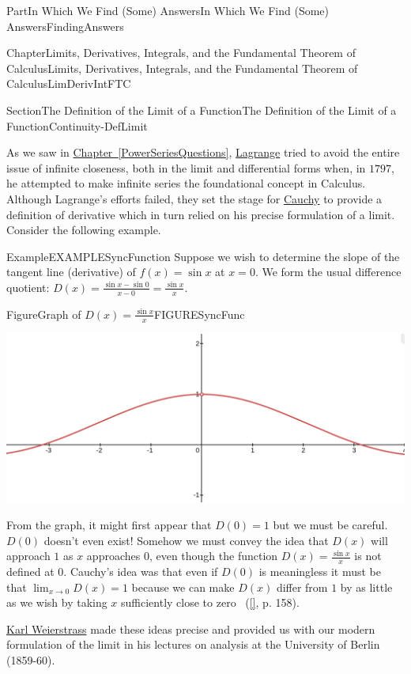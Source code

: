 \documentclass[oneside,10pt,]{book}
\newcommand{\xreffont}{\relax}
\numberwithin{equation}{part}
\def\limit#1#2#3{{\displaystyle\lim_{#1\rightarrow #2}#3}}
\begin{document}
\begin{partptx}{Part}{In Which We Find (Some) Answers}{}{In Which We Find (Some) Answers}{}{}{FindingAnswers}
\begin{chapterptx}{Chapter}{Limits, Derivatives, Integrals, and the Fundamental Theorem of Calculus}{}{Limits, Derivatives, Integrals, and the Fundamental Theorem of Calculus}{}{}{LimDerivIntFTC}
\begin{sectionptx}{Section}{The Definition of the Limit of a Function}{}{The Definition of the Limit of a Function}{}{}{Continuity-DefLimit}
\par
{} As we saw in \hyperref[PowerSeriesQuestions]{Chapter~{\xreffont\ref{PowerSeriesQuestions}}}, \href{https://mathshistory.st-andrews.ac.uk/Biographies/Lagrange/}{Lagrange} tried to avoid the entire issue of infinite closeness, both in the limit and differential forms when, in \(1797\), he attempted to make infinite series the foundational concept in Calculus.  Although Lagrange's efforts failed, they set the stage for \href{https://mathshistory.st-andrews.ac.uk/Biographies/Cauchy/}{Cauchy} to provide a definition of derivative which in turn relied on his precise formulation of a limit.  Consider the following example.%
\begin{example}{Example}{}{EXAMPLESyncFunction}%
Suppose we wish to determine the slope of the tangent line (derivative) of \(f(x) = \sin x\) at \(x=0\).  We form the usual difference quotient: \(D(x)=\frac{\sin x - \sin
0}{x-0}=\frac{\sin x
}{x}\).  %
\begin{figureptx}{Figure}{Graph of \(\displaystyle D(x)=\frac{\sin x }{x}\)}{FIGURESyncFunc}{}%
\begin{image}{0.125}{0.75}{0.125}{}%
\includegraphics[width=\linewidth]{external/images/SinGraph-1.png}
\end{image}%
\tcblower
\end{figureptx}%
From the graph, it might first appear that \(D(0) =1\) but we must be careful.  \(D(0)\) doesn't even exist! Somehow we must convey the idea that \(D(x)\) will approach \(1\) as \(x\) approaches \(0\), even though the function \(D(x)=\frac{\sin x }{x}\) is not defined at \(0\).  Cauchy's idea was that even if \(D(0)\) is meaningless it must be that \(\limit{x}{0}{D(x)}=1\) because we can make \(D(x)\) differ from \(1\) by as little as we wish by taking \(x\) sufficiently close to zero ~(\hyperlink{jahnke03__histor_analy}{[{\xreffont 6}]}, p. 158).%
\end{example}
 \href{https://mathshistory.st-andrews.ac.uk/Biographies/Weierstrass/}{Karl Weierstrass} made these ideas precise  and provided us with our modern formulation of the limit in his lectures on analysis at the University of Berlin (1859-60).%

\end{sectionptx}
\end{chapterptx}
\end{partptx}
\end{document}
